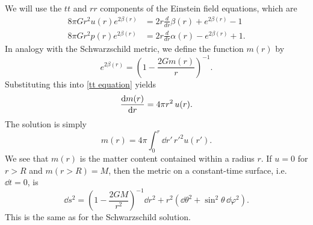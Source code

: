 %
We will use the $tt$ and $rr$ components of the Einstein field equations, which are
%
\begin{align}
    \label{tt equation}
    8 \pi G r^{2} u{\left(r \right)} e^{2 \beta{\left(r \right)}} 
    & =   2 r \frac{d}{d r} \beta{\left(r \right)} + e^{2 \beta{\left(r \right)}} - 1 \\
    \label{rr equation}
    8 \pi G r^{2} p{\left(r \right)} e^{2 \beta{\left(r \right)}} 
    & = 2 r \frac{d}{d r} \alpha{\left(r \right)} - e^{2 \beta{\left(r \right)}} + 1.
\end{align}
%
In analogy with the Schwarzschild metric, we define the function $m(r)$ by
%
\begin{equation}
    e^{2 \beta(r)} = \left(1 - \frac{2 G m(r)}{r} \right)^{-1}. 
\end{equation}
%
Substituting this into \autoref{tt equation} yields 
%
\begin{equation}
    \label{diff eq mass}
    \diff{m(r)}{r} = 4 \pi r^2 \, u(r).
\end{equation}
%
The solution is simply
%
\begin{equation}
    \label{mass relation}
    m(r) = 4 \pi \int_0^r \dd r' \, {r'}^2 u(r').
\end{equation}
%
We see that $m(r)$ is the matter content contained within a radius $r$.
If $u = 0$ for $r > R$ and $m(r>R) = M$, then the metric on a constant-time surface, i.e. $\dd t = 0$, is
%
\begin{equation}
    \dd s^2
    = 
    \left( 1 - \frac{2 G M}{r^2} \right)^{-1} \dd r^2 
    + r^2 (\dd \theta^2 + \sin^2 \theta \, \dd\varphi^2).
\end{equation} 
%
This is the same as for the Schwarzschild solution.

